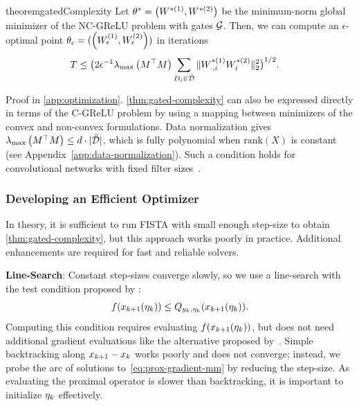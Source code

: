 \begin{restatable}{theorem}{gatedComplexity}\label{thm:gated-complexity}
    Let \( \theta^* = \left(W^{*(1)}, W^{*(2)}\right) \) be the minimum-norm global
    minimizer of the NC-GReLU problem with gates \( \mathcal{G} \).
    Then, we can compute an \( \epsilon \)-optimal point
    \( \theta_\epsilon = (\left(W^{(1)}_\epsilon, W^{(2)}_\epsilon\right)) \) in
    iterations
    \begin{equation*}
        \begin{aligned}
            T & \leq \big(2 \epsilon^{-1} \lambda_{\text{max}}\left(M^\top
                M\right)\sum_{D_i \in \tilde {\mathcal{D}}} \|W^{*(1)}_{\cdot, i}
                W^{*(2)}_{i}\|_2^2\big)^{1/2}.
        \end{aligned}
    \end{equation*}
\end{restatable}

Proof in \cref{app:optimization}.
\cref{thm:gated-complexity} can also be expressed directly in terms of the C-GReLU problem by using a mapping between minimizers of the convex and non-convex formulations.
Data normalization gives \( \lambda_{\text{max}}\left(M^\top M\right) \leq d \cdot |\tilde {\mathcal{D}} |  \), which is fully polynomial when \( \text{rank} (X) \) is constant (see Appendix~\ref{app:data-normalization}).
Such a condition holds for convolutional networks with fixed filter sizes~\citep{pilanci2020convexnn}.

\subsubsection{Developing an Efficient Optimizer}\label{sec:efficient-fista}

In theory, it is sufficient to run FISTA with small enough step-size to obtain \cref{thm:gated-complexity}, but this approach works poorly in practice.
Additional enhancements are required for fast and reliable solvers.

\textbf{Line-Search}:
Constant step-sizes converge slowly, so we use a line-search with the test condition proposed by \citet{beck2009fista}:
\begin{equation}\label{unconstrained:eq:line-search-cond}
    f(x_{k+1}(\eta_k)) \leq Q_{y_k, \eta_k}(x_{k+1}(\eta_k)).
\end{equation}
Computing this condition requires evaluating \( f(x_{k+1}(\eta_k)) \), but does not need additional gradient evaluations like the alternative proposed by~\citet{nesterov2007proximalgradient}.
Simple backtracking along \( x_{k+1} - x_k \)  works poorly and does not converge;
instead, we probe the arc of solutions to~\eqref{eq:prox-gradient-mm} by reducing the step-size.
As evaluating the proximal operator is slower than backtracking, it is important to initialize \( \eta_k \) effectively.

